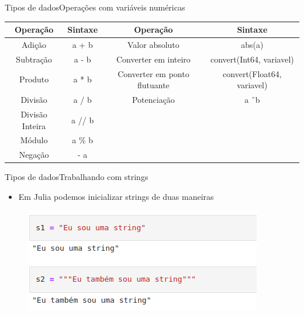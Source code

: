 \documentclass{beamer}
\begin{document}
\begin{frame}{Tipos de dados}{Operações com variáveis numéricas}
    \tiny
    \begin{table}[]
        \centering
        \begin{tabular}{|c|c|c|c|}
            \hline
            \textbf{Operação} & \textbf{Sintaxe} & \textbf{Operação} & \textbf{Sintaxe} \\
             \hline \hline
            Adição & a + b & Valor absoluto & abs(a) \\\hline
            Subtração & a - b & Converter em inteiro & convert(Int64, variavel) \\\hline
            Produto & a * b & Converter em ponto flutuante & convert(Float64, variavel) \\\hline
            Divisão & a / b & Potenciação & a \^\ b \\\hline
            Divisão Inteira & a // b &  &  \\\hline
            Módulo & a \% b &  &  \\\hline
            Negação & - a &  &  \\\hline
        \end{tabular}
        \label{tab:tabela}
    \end{table}
\end{frame}

\begin{frame}{Tipos de dados}{Trabalhando com strings}
    \begin{itemize}
        \item Em Julia podemos inicializar strings de duas maneiras
    \end{itemize}
    \begin{figure}
        \centering
        \includegraphics[scale=0.5]{imagens/strings01.png}
        \label{fig:my_label}
    \end{figure}
\end{frame}
\end{document}
